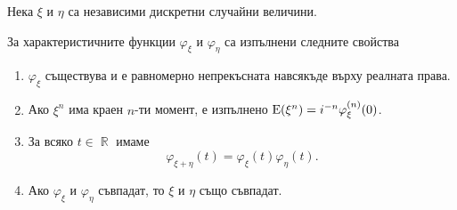 \documentclass{../../common/topic}
\begin{document}
\begin{theorem}\label{thm:char_properties}
  Нека \( \xi \) и \( \eta \) са независими дискретни случайни величини.

  За характеристичните функции \( \varphi_\xi \) и \( \varphi_\eta \) са изпълнени следните свойства
  \begin{enumerate}
    \item \( \varphi_\xi \) съществува и е равномерно непрекъсната навсякъде върху реалната права.

    \item Ако \( \xi^n \) има краен \( n \)-ти момент, е изпълнено \( \operatorname{E}(\xi^n) = i^{-n} \varphi_\xi^{(n)} (0) \).

    \item За всяко \( t \in \BbbR \) имаме
    \begin{equation*}
      \varphi_{\xi + \eta}(t) = \varphi_\xi(t) \varphi_\eta(t).
    \end{equation*}

    \item Ако \( \varphi_\xi \) и \( \varphi_\eta \) съвпадат, то \( \xi \) и \( \eta \) също съвпадат.
  \end{enumerate}
\end{theorem}
\end{document}
